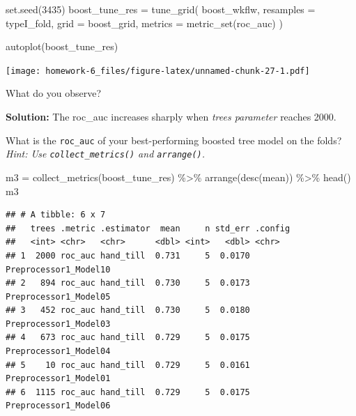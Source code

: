 \documentclass[
]{article}
\newenvironment{Shaded}{\begin{snugshade}}{\end{snugshade}}
\newcommand{\AttributeTok}[1]{\textcolor[rgb]{0.77,0.63,0.00}{#1}}
\newcommand{\DecValTok}[1]{\textcolor[rgb]{0.00,0.00,0.81}{#1}}
\newcommand{\FunctionTok}[1]{\textcolor[rgb]{0.00,0.00,0.00}{#1}}
\newcommand{\NormalTok}[1]{#1}
\newcommand{\OtherTok}[1]{\textcolor[rgb]{0.56,0.35,0.01}{#1}}
\newcommand{\SpecialCharTok}[1]{\textcolor[rgb]{0.00,0.00,0.00}{#1}}
\begin{document}
\begin{Shaded}
\begin{Highlighting}[]
\FunctionTok{set.seed}\NormalTok{(}\DecValTok{3435}\NormalTok{)}
\NormalTok{boost\_tune\_res }\OtherTok{=} \FunctionTok{tune\_grid}\NormalTok{(}
\NormalTok{  boost\_wkflw,}
  \AttributeTok{resamples =}\NormalTok{ typeI\_fold, }
  \AttributeTok{grid =}\NormalTok{ boost\_grid,}
  \AttributeTok{metrics =} \FunctionTok{metric\_set}\NormalTok{(roc\_auc)}
\NormalTok{)}
\end{Highlighting}
\end{Shaded}

\begin{Shaded}
\begin{Highlighting}[]
\FunctionTok{autoplot}\NormalTok{(boost\_tune\_res)}
\end{Highlighting}
\end{Shaded}

\texttt{[image: homework-6\_files/figure-latex/unnamed-chunk-27-1.pdf]}

What do you observe?

\textbf{Solution: }The roc\_auc increases sharply when \emph{trees
parameter} reaches 2000.

What is the \texttt{roc\_auc} of your best-performing boosted tree model
on the folds? \emph{Hint: Use \texttt{collect\_metrics()} and
\texttt{arrange()}.}

\begin{Shaded}
\begin{Highlighting}[]
\NormalTok{m3 }\OtherTok{=} \FunctionTok{collect\_metrics}\NormalTok{(boost\_tune\_res) }\SpecialCharTok{\%\textgreater{}\%} \FunctionTok{arrange}\NormalTok{(}\FunctionTok{desc}\NormalTok{(mean)) }\SpecialCharTok{\%\textgreater{}\%} \FunctionTok{head}\NormalTok{()}
\NormalTok{m3}
\end{Highlighting}
\end{Shaded}

\begin{verbatim}
## # A tibble: 6 x 7
##   trees .metric .estimator  mean     n std_err .config              
##   <int> <chr>   <chr>      <dbl> <int>   <dbl> <chr>                
## 1  2000 roc_auc hand_till  0.731     5  0.0170 Preprocessor1_Model10
## 2   894 roc_auc hand_till  0.730     5  0.0173 Preprocessor1_Model05
## 3   452 roc_auc hand_till  0.730     5  0.0180 Preprocessor1_Model03
## 4   673 roc_auc hand_till  0.729     5  0.0175 Preprocessor1_Model04
## 5    10 roc_auc hand_till  0.729     5  0.0161 Preprocessor1_Model01
## 6  1115 roc_auc hand_till  0.729     5  0.0175 Preprocessor1_Model06
\end{verbatim}
\end{document}
